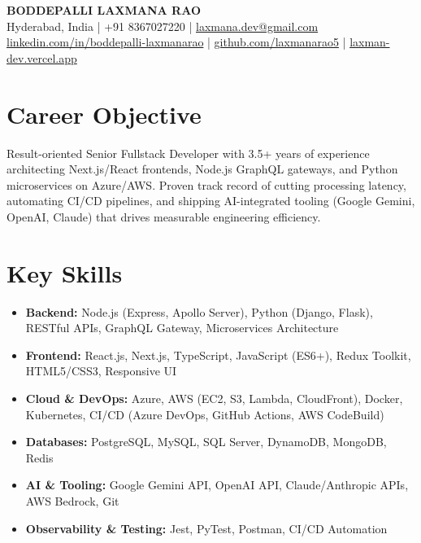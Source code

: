 \documentclass[a4paper,10pt]{article}
\begin{document}
\begin{center}
    {\Huge \bfseries BODDEPALLI LAXMANA RAO} \\
    \vspace{2pt}
    Hyderabad, India | +91 8367027220 | \href{mailto:laxmana.dev@gmail.com}{laxmana.dev@gmail.com} \\
    \href{http://linkedin.com/in/boddepalli-laxmanarao/}{linkedin.com/in/boddepalli-laxmanarao} | \href{https://github.com/laxmanarao5}{github.com/laxmanarao5} | \href{https://laxman-dev.vercel.app}{laxman-dev.vercel.app}
\end{center}
\section{Career Objective}
Result-oriented Senior Fullstack Developer with 3.5+ years of experience architecting Next.js/React frontends, Node.js GraphQL gateways, and Python microservices on Azure/AWS. Proven track record of cutting processing latency, automating CI/CD pipelines, and shipping AI-integrated tooling (Google Gemini, OpenAI, Claude) that drives measurable engineering efficiency.

\section{Key Skills}
\begin{itemize}
    \item \textbf{Backend:} Node.js (Express, Apollo Server), Python (Django, Flask), RESTful APIs, GraphQL Gateway, Microservices Architecture
    \item \textbf{Frontend:} React.js, Next.js, TypeScript, JavaScript (ES6+), Redux Toolkit, HTML5/CSS3, Responsive UI
    \item \textbf{Cloud \& DevOps:} Azure, AWS (EC2, S3, Lambda, CloudFront), Docker, Kubernetes, CI/CD (Azure DevOps, GitHub Actions, AWS CodeBuild)
    \item \textbf{Databases:} PostgreSQL, MySQL, SQL Server, DynamoDB, MongoDB, Redis
    \item \textbf{AI \& Tooling:} Google Gemini API, OpenAI API, Claude/Anthropic APIs, AWS Bedrock, Git
    \item \textbf{Observability \& Testing:} Jest, PyTest, Postman, CI/CD Automation
\end{itemize}

\end{document}
